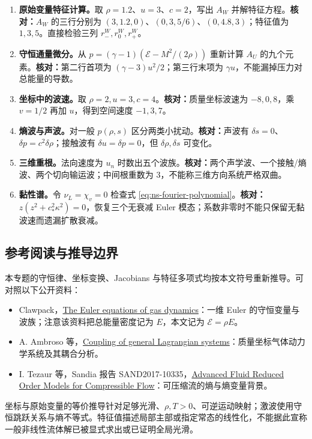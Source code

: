 \begin{enumerate}
 \item \textbf{原始变量特征计算。}取 $\rho=1.2$、$u=3$、$c=2$，写出 $A_W$ 并解特征方程。\textbf{核对：}$A_W$ 的三行分别为 $(3,1.2,0)$、$(0,3,5/6)$、$(0,4.8,3)$；特征值为 $1,3,5$。直接检验三列 $r_-^W,r_0^W,r_+^W$。
 \item \textbf{守恒通量微分。}从 $p=(\gamma-1)(\mathcal E-M^2/(2\rho))$ 重新计算 $A_U$ 的九个元素。\textbf{核对：}第二行首项为 $(\gamma-3)u^2/2$；第三行末项为 $\gamma u$，不能漏掉压力对总能量的导数。
 \item \textbf{坐标中的波速。}取 $\rho=2,u=3,c=4$。\textbf{核对：}质量坐标波速为 $-8,0,8$，乘 $v=1/2$ 再加 $u$，得到空间速度 $-1,3,7$。
 \item \textbf{熵波与声波。}对一般 $p(\rho,s)$ 区分两类小扰动。\textbf{核对：}声波有 $\delta s=0$、$\delta p=c^2\delta\rho$；接触波有 $\delta u=\delta p=0$，但 $\delta\rho,\delta s$ 可变化。
 \item \textbf{三维重根。}法向速度为 $u_n$ 时数出五个波族。\textbf{核对：}两个声学波、一个接触/熵波、两个切向输运波；中间根重数为 $3$，不能称三维方向系统严格双曲。
 \item \textbf{黏性谱。}令 $\nu_L=\chi_v=0$ 检查式 \eqref{eq:ns-fourier-polynomial}。\textbf{核对：}$z(z^2+c_*^2\kappa^2)=0$，恢复三个无衰减 Euler 模态；系数非零时不能只保留无黏波速而遗漏扩散衰减。
\end{enumerate}

\subsection{参考阅读与推导边界}

本专题的守恒律、坐标变换、Jacobians 与特征多项式均按本文符号重新推导。可对照以下公开资料：
\begin{itemize}
 \item Clawpack，\href{https://www.clawpack.org/riemann_book/html/Euler.html}{The Euler equations of gas dynamics}：一维 Euler 的守恒变量与波族；注意该资料把总能量密度记为 $E$，本文记为 $\mathcal E=\rho E$。
 \item A. Ambroso 等，\href{https://chalons.perso.math.cnrs.fr/Gdt_MathComp.pdf}{Coupling of general Lagrangian systems}：质量坐标气体动力学系统及其耦合分析。
 \item I. Tezaur 等，Sandia 报告 SAND2017-10335，\href{https://www.sandia.gov/app/uploads/sites/127/2021/10/FY17_SAND_report.pdf}{Advanced Fluid Reduced Order Models for Compressible Flow}：可压缩流的熵与熵变量背景。
\end{itemize}
坐标与原始变量的等价推导针对足够光滑、$\rho,T>0$、可逆运动映射；激波使用守恒跳跃关系与熵不等式。特征值描述局部主部或指定常态的线性化，不能据此宣称一般非线性流体解已被显式求出或已证明全局光滑。
